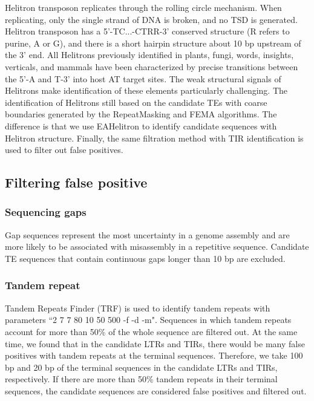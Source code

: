\documentclass{bmcart}
\begin{document}
Helitron transposon replicates through the rolling circle mechanism. When replicating, only the single strand of DNA is broken, and no TSD is generated. Helitron transposon has a 5'-TC...-CTRR-3' conserved structure (R refers to purine, A or G), and there is a short hairpin structure about 10 bp upstream of the 3' end. All Helitrons previously identified in plants, fungi, words, insights, verticals, and mammals have been characterized by precise transitions between the 5'-A and T-3' into host AT target sites\cite{kapitonov2007helitrons}. The weak structural signals of Helitrons make identification of these elements particularly challenging. The identification of Helitrons still based on the candidate TEs with coarse boundaries generated by the RepeatMasking and FEMA algorithms. The difference is that we use EAHelitron\cite{hu2019helitron} to identify candidate sequences with Helitron structure. Finally, the same filtration method with TIR identification is used to filter out false positives.


\subsection*{Filtering false positive}
\subsubsection*{Sequencing gaps}
Gap sequences represent the most uncertainty in a genome assembly and are more likely to be associated with misassembly in a repetitive sequence\cite{ou2019benchmarking}. Candidate TE sequences that contain continuous gaps longer than 10 bp are excluded.

\subsubsection*{Tandem repeat}
Tandem Repeats Finder (TRF)\cite{benson1999tandem} is used to identify tandem repeats with parameters ``2 7 7 80 10 50 500 -f -d -m". Sequences in which tandem repeats account for more than 50\% of the whole sequence are filtered out. At the same time, we found that in the candidate LTRs and TIRs, there would be many false positives with tandem repeats at the terminal sequences. Therefore, we take 100 bp and 20 bp of the terminal sequences in the candidate LTRs and TIRs, respectively. If there are more than 50\% tandem repeats in their terminal sequences, the candidate sequences are considered false positives and filtered out.
\end{document}
